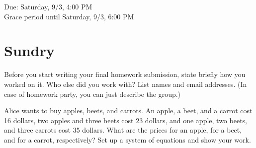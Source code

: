 \documentclass[11pt]{article}
\begin{document}
\maketitle
\fontsize{12}{15}\selectfont

\begin{center}
    Due: Saturday, 9/3, 4:00 PM \\
    Grace period until Saturday, 9/3, 6:00 PM \\
\end{center}

\section*{Sundry}
Before you start writing your final homework submission, state briefly how you worked on it.  Who else did you work with?  List names and email addresses.  (In case of homework party, you can just describe the group.)

{\color{blue}{I did not work with anyobdy to complete this homework. To calculate large factorials (such as $100!$), I used WolframAlpha to get an approximate value for its decimal expansion, but aside from that I did not use any other online source to complete this homework.}}

\vspace{15pt}


Alice wants to buy apples, beets, and carrots. An apple, a beet, and a carrot cost 16 dollars, two apples and three beets cost 23 dollars, and one apple, two beets, and three carrots cost 35 dollars. What are the prices for an apple, for a beet, and for a carrot, respectively? Set up a system of equations and show your work.
\end{document}
